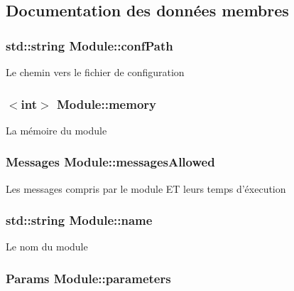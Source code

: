 \subsection{Documentation des données membres}
\hypertarget{classModule_a5c7481c5ac746e01b225b6782e915dac}{
\subsubsection[{conf\-Path}]{\setlength{\rightskip}{0pt plus 5cm}std\-::string Module\-::conf\-Path\hspace{0.3cm}{\ttfamily [protected]}}}\label{classModule_a5c7481c5ac746e01b225b6782e915dac}
Le chemin vers le fichier de configuration \hypertarget{classModule_a48fa02fe55d33daffff725c615a63bb9}{
\subsubsection[{memory}]{$<$int$>$ Module\-::memory\hspace{0.3cm}{\ttfamily [protected]}}}\label{classModule_a48fa02fe55d33daffff725c615a63bb9}
La mémoire du module \hypertarget{classModule_aaadd1f971bebf7bb5eae12fcc5689198}{
\subsubsection[{messages\-Allowed}]{\setlength{\rightskip}{0pt plus 5cm}Messages Module\-::messages\-Allowed\hspace{0.3cm}{\ttfamily [protected]}}}\label{classModule_aaadd1f971bebf7bb5eae12fcc5689198}
Les messages compris par le module E\-T leurs temps d'éxecution \hypertarget{classModule_a794fbb44972c7c73cc197159093e66d1}{
\subsubsection[{name}]{\setlength{\rightskip}{0pt plus 5cm}std\-::string Module\-::name\hspace{0.3cm}{\ttfamily [protected]}}}\label{classModule_a794fbb44972c7c73cc197159093e66d1}
Le nom du module \hypertarget{classModule_a232443111a9d59c17724992ddf75fbad}{
\subsubsection[{parameters}]{\setlength{\rightskip}{0pt plus 5cm}Params Module\-::parameters\hspace{0.3cm}{\ttfamily [protected]}}}\label{classModule_a232443111a9d59c17724992ddf75fbad}
